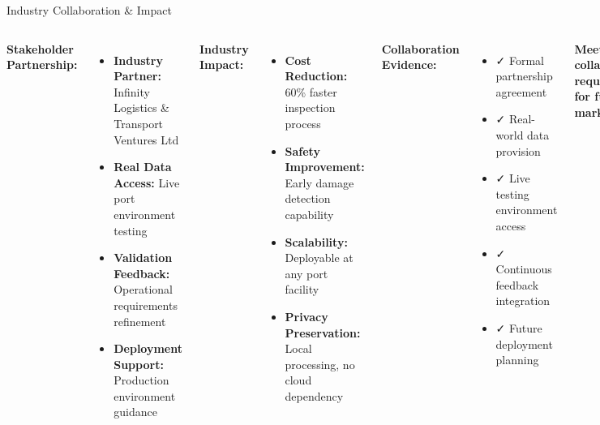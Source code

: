 \documentclass[aspectratio=169]{beamer}
\begin{document}
\begin{frame}{Industry Collaboration \& Impact}
\begin{columns}
\textbf{Stakeholder Partnership:}
\begin{itemize}
\item \textbf{Industry Partner:} Infinity Logistics \& Transport Ventures Ltd
\item \textbf{Real Data Access:} Live port environment testing
\item \textbf{Validation Feedback:} Operational requirements refinement
\item \textbf{Deployment Support:} Production environment guidance
\end{itemize}

\vspace{0.3cm}
\textbf{Industry Impact:}
\begin{itemize}
\item \textbf{Cost Reduction:} 60\% faster inspection process
\item \textbf{Safety Improvement:} Early damage detection capability
\item \textbf{Scalability:} Deployable at any port facility
\item \textbf{Privacy Preservation:} Local processing, no cloud dependency
\end{itemize}

\textbf{Collaboration Evidence:}
\begin{itemize}
\item \textcolor{successgreen}{✓} Formal partnership agreement
\item \textcolor{successgreen}{✓} Real-world data provision
\item \textcolor{successgreen}{✓} Live testing environment access
\item \textcolor{successgreen}{✓} Continuous feedback integration
\item \textcolor{successgreen}{✓} Future deployment planning
\end{itemize}

\vspace{0.5cm}
\begin{center}
\textcolor{umblue}{\textbf{Meets all collaboration requirements for full marks}}
\end{center}
\end{columns}
\end{frame}
\end{document}
